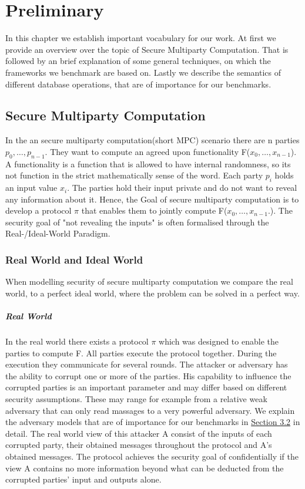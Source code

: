 \chapter{Preliminary}
In this chapter we establish important vocabulary for our work. At first we provide an overview over the topic of Secure Multiparty Computation. That is followed by an brief explanation of some general techniques, on which the frameworks we benchmark are based on. 
Lastly we describe the semantics of different database operations, that are of importance for our benchmarks.  
\section{Secure Multiparty Computation}
In the an secure multiparty computation(short MPC) scenario there are n parties 
$ p_0,\dots,p_{n-1} $. They want to compute an agreed upon functionality F($ x_0,\dots,x_{n-1} $). A functionality is a function that is allowed to have internal randomness, so its not function in the strict mathematically sense of the word. 
Each party $ p_i $ holds an input value $ x_i $. 
The parties hold their input private and do not want to reveal any information about it. Hence, the Goal of secure multiparty computation is to develop a protocol  $ \pi $ that enables them to jointly compute F($ x_0,\dots,x_{n-1}. $). The security goal of "not revealing the inputs" is often formalised through the Real-/Ideal-World Paradigm. 


\subsection{Real World and Ideal World}
When modelling security of secure multiparty computation we compare the real world, to a perfect ideal world, where the problem can be solved in a perfect way.
\paragraph{Real World}
In the real world there exists a protocol $\pi $ which was designed to enable the parties to compute F. All parties execute the protocol together. During the execution they communicate for several rounds. The attacker or adversary has the ability to corrupt one or more of the parties. His capability to influence the corrupted parties is an important parameter and may differ based on different security assumptions. These may range for example from a relative weak adversary that can only read massages to a very powerful adversary. We explain the adversary models that are of importance for our benchmarks in \hyperref[sec:Adversarial Models]{Section 3.2} in detail.
The real world view of this attacker A consist of the inputs of each corrupted party, their obtained messages throughout the protocol and A's obtained messages. The protocol achieves the security goal of confidentially if the view A contains no more information beyond what can be deducted from the corrupted parties' input and outputs alone. 
